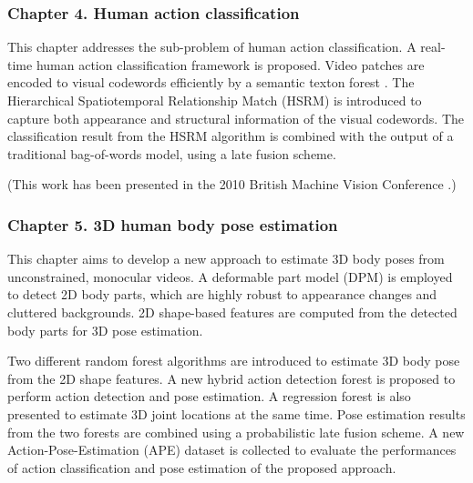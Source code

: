 \subsubsection*{Chapter 4. Human action classification} 

This chapter addresses the sub-problem of human action classification. A real-time human action classification framework is proposed. Video patches are encoded to visual codewords efficiently by a semantic texton forest \cite{Shotton2008}. The Hierarchical Spatiotemporal Relationship Match (HSRM) is introduced to capture both appearance and structural information of the visual codewords. The classification result from the HSRM algorithm is combined with the output of a traditional bag-of-words model, using a late fusion scheme.  

(This work has been presented in the 2010 British Machine Vision Conference \cite{Yu2010}.)  

\subsubsection*{Chapter 5. 3D human body pose estimation} 

This chapter aims to develop a new approach to estimate 3D body poses from unconstrained, monocular videos. 
A deformable part model (DPM) is employed to detect 2D body parts, which are highly robust to appearance changes and cluttered backgrounds. 2D shape-based features are computed from the detected body parts for 3D pose estimation. 

Two different random forest algorithms are introduced to estimate 3D body pose from the 2D shape features. 
A new hybrid action detection forest is proposed to perform action detection and pose estimation. A regression forest is also presented to estimate 3D joint locations at the same time. Pose estimation results from the two forests are combined using a probabilistic late fusion scheme. A new Action-Pose-Estimation (APE) dataset is collected to evaluate the performances of action classification and pose estimation of the proposed approach. 

